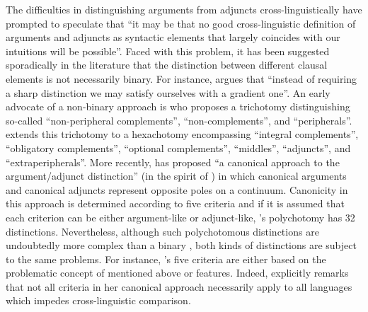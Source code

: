 The difficulties in distinguishing arguments from adjuncts cross-linguistically have prompted \citet[4]{haspelmath:2014} to speculate that “it may be that no good cross-linguistic definition of arguments and adjuncts as syntactic elements that largely coincides with our intuitions will be possible”. Faced with this problem, it has been suggested sporadically in the literature that the distinction between different clausal elements is not necessarily binary. For instance, \citet[1]{wichmann:2014} argues that “instead of requiring a sharp distinction we may satisfy ourselves with a gradient one”. An early advocate of a non-binary approach is \citet[140f.]{matthews:1981} who proposes a trichotomy distinguishing so-called “non-peripheral complements”, “non-complements”, and “peripherals”. \citet[524]{somers:1984} extends this trichotomy to a hexachotomy encompassing “integral complements”, “obligatory complements”, “optional complements”, “middles”, “adjuncts”, and “extra\-peripherals”. More recently, \citet{forker:2014} has proposed “a canonical approach to the argument/adjunct distinction” (in the spirit of \citealt{corbett:2005, corbett:2007, corbett:2013, brown:al:2013}) in which canonical arguments and canonical adjuncts represent opposite poles on a continuum. Canonicity in this approach is determined according to five criteria \citep[28ff.]{forker:2014} and if it is assumed that each criterion can be either argument-like or adjunct-like, \citeauthor{forker:2014}’s polychotomy has 32 distinctions. Nevertheless, although such polychotomous distinctions are undoubtedly more complex than a binary , both kinds of distinctions are subject to the same problems. For instance, \citeauthor{forker:2014}’s five criteria are either based on the problematic concept of  mentioned above \citep[46ff.]{haspelmath:hartmann:2015} or  features. Indeed, \citet[36]{forker:2014} explicitly remarks that not all criteria in her canonical approach necessarily apply to all languages which impedes cross-linguistic comparison.

